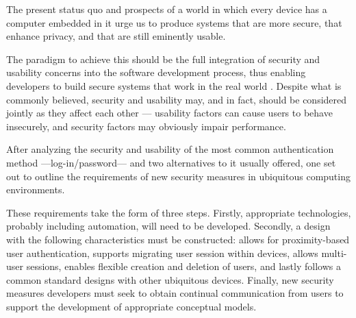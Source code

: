 \documentclass{article}
\begin{document}
The present status quo and prospects of a world in which every device has a computer embedded in it urge us to produce systems that are more secure, that enhance privacy, and that are still eminently usable. 

The paradigm to achieve this should be the full integration of security and usability concerns into the software development process, thus enabling developers to build secure systems that work in the real world \cite{flechais2003bringing}. Despite what is commonly believed, security and usability may, and in fact, should be considered jointly as they affect each other --- usability factors can cause users to behave insecurely, and security factors may obviously impair performance.

After analyzing the security and usability of the most common authentication method ---log-in/password--- and two alternatives to it usually offered, one set out to outline the requirements of new security measures in ubiquitous computing environments.

These requirements take the form of three steps. Firstly, appropriate technologies, probably including automation, will need to be developed. Secondly, a design with the following characteristics must be constructed: allows for proximity-based user authentication, supports migrating user session within devices, allows multi-user sessions, enables flexible creation and deletion of users, and lastly follows a common standard designs with other ubiquitous devices. Finally, new security measures developers must seek to obtain continual communication from users to support the development of appropriate conceptual models.



\end{document}
